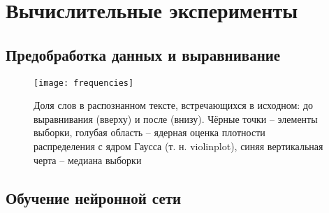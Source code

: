 \documentclass{main.tex}[subfiles]
\begin{document}
\section{Вычислительные эксперименты}
\subsection{Предобработка данных и выравнивание}

\begin{figure}[H]
    \centering
    \texttt{[image: frequencies]}
    \caption{Доля слов в распознанном тексте, встречающихся в исходном: до выравнивания (вверху) и после (внизу). Чёрные точки -- элементы выборки, голубая область -- ядерная оценка плотности распределения с ядром Гаусса (т. н. violinplot), синяя вертикальная черта -- медиана выборки}
    \label{fig:frequencies} %
\end{figure}

\subsection{Обучение нейронной сети}
\end{document}
